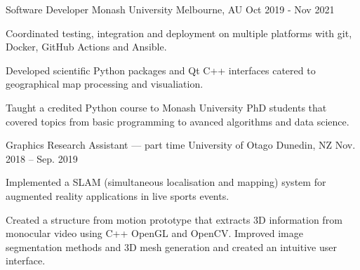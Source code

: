 
\begin{cventries}
  \cventry
    {Software Developer} %
    {Monash University} %
    {Melbourne, AU} %
    {Oct 2019 - Nov 2021} %
    {
      \begin{cvitems} %
        \item {Coordinated testing, integration and deployment on multiple platforms with git, Docker, GitHub Actions and Ansible.}
        \item {Developed scientific Python packages and Qt C++ interfaces catered to geographical map processing and visualiation.} 
        \item {Taught a credited Python course to Monash University PhD students that covered topics from basic programming to avanced algorithms and data science.}
      \end{cvitems}
    }

  \cventry
    {Graphics Research Assistant --- part time} %
    {University of Otago} %
    {Dunedin, NZ} %
    {Nov. 2018 – Sep. 2019} %
    {
      \begin{cvitems} %
        \item {Implemented a SLAM (simultaneous localisation and mapping) system for augmented reality applications in live sports events.}
        \item {Created a structure from motion prototype that extracts 3D information from monocular video using C++ OpenGL and OpenCV. Improved image segmentation methods and 3D mesh generation and created an intuitive user interface.}
      \end{cvitems}
    }



\end{cventries}

